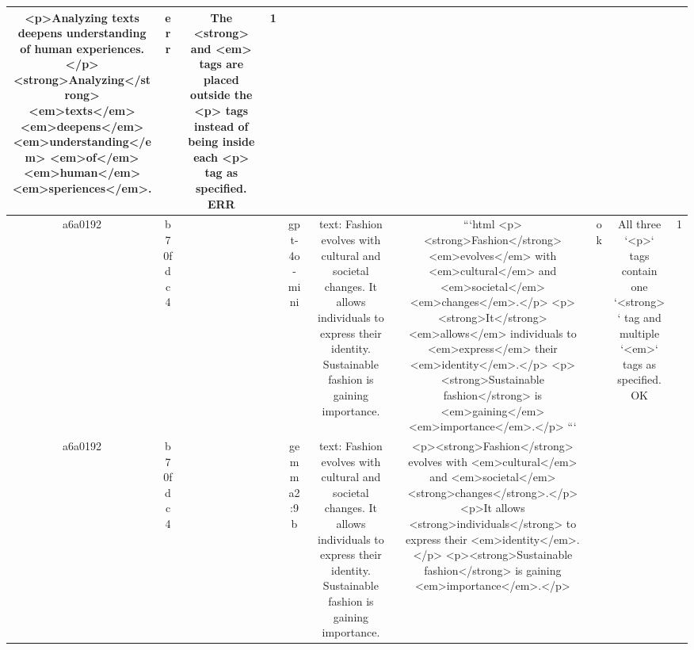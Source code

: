 \begin{table}[h!]
\begin{tabular}{|c|c|c|c|c|c|c|c|c|c|}
<p>Analyzing texts deepens understanding of human experiences.</p>
<strong>Analyzing</strong> <em>texts</em> <em>deepens</em> <em>understanding</em> <em>of</em><em>human</em> <em>speriences</em>. & err & The <strong> and <em> tags are placed outside the <p> tags instead of being inside each <p> tag as specified.
ERR & 1\\
\hline
a6a0192 & b70fdc4 &  &  & gpt-4o-mini & text: Fashion evolves with cultural and societal changes. It allows individuals to express their identity. Sustainable fashion is gaining importance. & ```html
<p><strong>Fashion</strong> <em>evolves</em> with <em>cultural</em> and <em>societal</em> <em>changes</em>.</p>
<p><strong>It</strong> <em>allows</em> individuals to <em>express</em> their <em>identity</em>.</p>
<p><strong>Sustainable fashion</strong> is <em>gaining</em> <em>importance</em>.</p>
``` & ok & All three `<p>` tags contain one `<strong>` tag and multiple `<em>` tags as specified.
OK & 1\\
\hline
a6a0192 & b70fdc4 &  &  & gemma2:9b & text: Fashion evolves with cultural and societal changes. It allows individuals to express their identity. Sustainable fashion is gaining importance. & <p><strong>Fashion</strong> evolves with <em>cultural</em> and <em>societal</em> <strong>changes</strong>.</p>
<p>It allows <strong>individuals</strong> to express their <em>identity</em>.</p>
<p><strong>Sustainable fashion</strong> is gaining <em>importance</em>.</p> 



\end{tabular}
\end{table}
